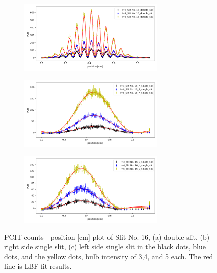 \documentclass{article}
\begin{document}
\begin{figure}[H]
  \begin{subfigure}[b]{7cm}
      \centering
      \includegraphics[width=7cm]{../results/bulb(16_double_slit)_fig.png}
      \caption{}
  \end{subfigure}
  \hfill
  \begin{subfigure}[b]{7cm}
    \centering
    \includegraphics[width=7cm]{../results/bulb(16_R_single_slit)_fig.png}
    \caption{}
\end{subfigure}
\hfill
\centering
\begin{subfigure}[b]{7cm}
  \centering
  \includegraphics[width=7cm]{../results/bulb(16_L_single_slit)_fig.png}
  \caption{}
\end{subfigure}
\hfill
  \caption{PCIT counts - position [cm] plot of Slit No. 16, (a) double slit, (b) right side single slit, (c) left side single slit in the black dots, blue dots, and the yellow dots, bulb intensity of 3,4, and 5 each.
      The red line is LBF fit results.
   }
  \label{fig: 16_bulb_plot}
\end{figure}
\end{document}
